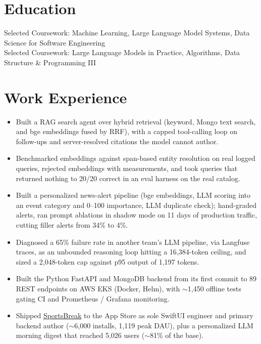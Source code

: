 \documentclass[11pt, letterpaper]{article}
\begin{document}

\section{Education}
Selected Coursework: Machine Learning, Large Language Model Systems, Data Science for Software Engineering\\[1pt]
Selected Coursework: Large Language Models in Practice, Algorithms, Data Structure \& Programming III

\section{Work Experience}
\begin{itemize}
  \item Built a RAG search agent over hybrid retrieval (keyword, Mongo text search, and bge embeddings fused by RRF), with a capped tool-calling loop on follow-ups and server-resolved citations the model cannot author.
  \item Benchmarked embeddings against span-based entity resolution on real logged queries, rejected embeddings with measurements, and took queries that returned nothing to 20/20 correct in an eval harness on the real catalog.
  \item Built a personalized news-alert pipeline (bge embeddings, LLM scoring into an event category and 0--100 importance, LLM duplicate check); hand-graded alerts, ran prompt ablations in shadow mode on 11 days of production traffic, cutting filler alerts from 34\% to 4\%.
  \item Diagnosed a 65\% failure rate in another team's LLM pipeline, via Langfuse traces, as an unbounded reasoning loop hitting a 16{,}384-token ceiling, and sized a 2{,}048-token cap against p95 output of 1{,}197 tokens.
  \item Built the Python FastAPI and MongoDB backend from its first commit to 89 REST endpoints on AWS EKS (Docker, Helm), with $\sim$1{,}450 offline tests gating CI and Prometheus / Grafana monitoring.
  \item Shipped \href{https://apps.apple.com/app/id6762649287}{SportsBreak} to the App Store as sole SwiftUI engineer and primary backend author ($\sim$6{,}000 installs, 1{,}119 peak DAU), plus a personalized LLM morning digest that reached 5{,}026 users ($\sim$81\% of the base).
\end{itemize}
\end{document}

